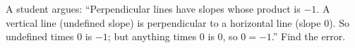 A student argues: ``Perpendicular lines have slopes whose product is $-1$. A vertical line (undefined slope) is perpendicular to a horizontal line (slope $0$). So undefined times $0$ is $-1$; but anything times $0$ is $0$, so $0=-1$.'' Find the error.

